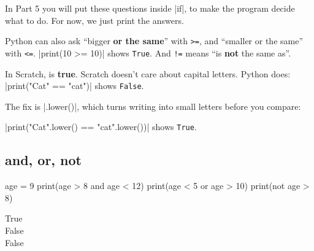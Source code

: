 In Part 5 you will put these questions inside \py|if|, to make the program decide what to do. For now, we just print the answers.

\begin{think}
Python can also ask ``bigger \textbf{or the same}'' with \texttt{>=}, and ``smaller or the same'' with \texttt{<=}. \py|print(10 >= 10)| shows \texttt{True}. And \texttt{!=} means ``is \textbf{not} the same as''.
\end{think}

\begin{watchout}
In Scratch,  is \textbf{true}. Scratch doesn't care about capital letters. Python does: \py|print("Cat" == "cat")| shows \texttt{False}.

The fix is \py|.lower()|, which turns writing into small letters before you compare:\par
\py|print("Cat".lower() == "cat".lower())| shows \texttt{True}.
\end{watchout}

\subsection*{and, or, not}

\begin{tcbraster}[raster columns=2, raster equal height=rows, raster column skip=12pt, raster valign=center, raster force size=false, raster odd column/.style={add to width=-1.2cm}, raster even column/.style={add to width=1.2cm}]
\begin{tcolorbox}[colback=white, colframe=white, boxrule=0pt, valign=center]
\begin{scratch}
\end{scratch}
\end{tcolorbox}
\begin{tcolorbox}[colback=white, colframe=white, boxrule=0pt, left=0pt, right=0pt, top=0pt, bottom=0pt, valign=center]
\begin{code}
age = 9
print(age > 8 and age < 12)
print(age < 5 or age > 10)
print(not age > 8)
\end{code}
\begin{outputbox}
True\\
False\\
False
\end{outputbox}
\end{tcolorbox}
\end{tcbraster}

